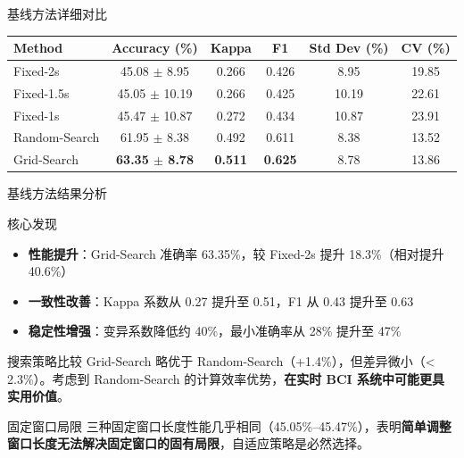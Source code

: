 {\begin{frame}{基线方法详细对比}
    \begin{center}
    \footnotesize
    \renewcommand{\arraystretch}{1.3}
    \begin{tabular}{lccccc}
        \hline
        \textbf{Method} & \textbf{Accuracy (\%)} & \textbf{Kappa} & \textbf{F1} & \textbf{Std Dev (\%)} & \textbf{CV (\%)} \\
        \hline
        Fixed-2s & 45.08 $\pm$ 8.95 & 0.266 & 0.426 & 8.95 & 19.85 \\
        Fixed-1.5s & 45.05 $\pm$ 10.19 & 0.266 & 0.425 & 10.19 & 22.61 \\
        Fixed-1s & 45.47 $\pm$ 10.87 & 0.272 & 0.434 & 10.87 & 23.91 \\
        Random-Search & 61.95 $\pm$ 8.38 & 0.492 & 0.611 & 8.38 & 13.52 \\
        Grid-Search & \textbf{63.35 $\pm$ 8.78} & \textbf{0.511} & \textbf{0.625} & 8.78 & 13.86 \\
        \hline
    \end{tabular}
    \end{center}
\end{frame}

\begin{frame}{基线方法结果分析}
    \begin{block}{核心发现}
        \footnotesize
        \begin{itemize}
            \item \textbf{性能提升}：Grid-Search 准确率 63.35\%，较 Fixed-2s 提升 18.3\%（相对提升 40.6\%）
            \item \textbf{一致性改善}：Kappa 系数从 0.27 提升至 0.51，F1 从 0.43 提升至 0.63
            \item \textbf{稳定性增强}：变异系数降低约 40\%，最小准确率从 28\% 提升至 47\%
        \end{itemize}
    \end{block}

    \vspace{0.2cm}
    \begin{block}{搜索策略比较}
        \footnotesize
        Grid-Search 略优于 Random-Search（+1.4\%），但差异微小（< 2.3\%）。考虑到 Random-Search 的计算效率优势，\textbf{在实时 BCI 系统中可能更具实用价值}。
    \end{block}

    \vspace{0.2cm}
    \begin{block}{固定窗口局限}
        \footnotesize
        三种固定窗口长度性能几乎相同（45.05\%--45.47\%），表明\textbf{简单调整窗口长度无法解决固定窗口的固有局限}，自适应策略是必然选择。
    \end{block}
\end{frame}

}

